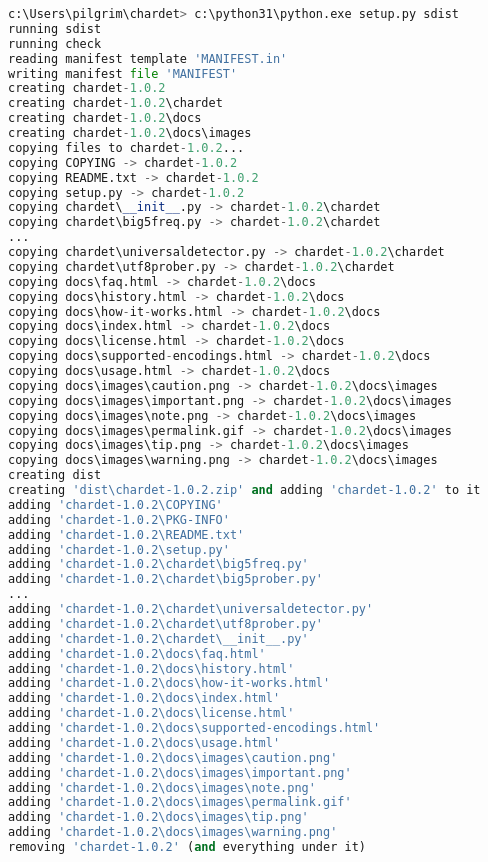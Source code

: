 {\begin{lstlisting}[language=Python,breaklines=true]
c:\Users\pilgrim\chardet> c:\python31\python.exe setup.py sdist
running sdist
running check
reading manifest template 'MANIFEST.in'
writing manifest file 'MANIFEST'
creating chardet-1.0.2
creating chardet-1.0.2\chardet
creating chardet-1.0.2\docs
creating chardet-1.0.2\docs\images
copying files to chardet-1.0.2...
copying COPYING -> chardet-1.0.2
copying README.txt -> chardet-1.0.2
copying setup.py -> chardet-1.0.2
copying chardet\__init__.py -> chardet-1.0.2\chardet
copying chardet\big5freq.py -> chardet-1.0.2\chardet
...
copying chardet\universaldetector.py -> chardet-1.0.2\chardet
copying chardet\utf8prober.py -> chardet-1.0.2\chardet
copying docs\faq.html -> chardet-1.0.2\docs
copying docs\history.html -> chardet-1.0.2\docs
copying docs\how-it-works.html -> chardet-1.0.2\docs
copying docs\index.html -> chardet-1.0.2\docs
copying docs\license.html -> chardet-1.0.2\docs
copying docs\supported-encodings.html -> chardet-1.0.2\docs
copying docs\usage.html -> chardet-1.0.2\docs
copying docs\images\caution.png -> chardet-1.0.2\docs\images
copying docs\images\important.png -> chardet-1.0.2\docs\images
copying docs\images\note.png -> chardet-1.0.2\docs\images
copying docs\images\permalink.gif -> chardet-1.0.2\docs\images
copying docs\images\tip.png -> chardet-1.0.2\docs\images
copying docs\images\warning.png -> chardet-1.0.2\docs\images
creating dist
creating 'dist\chardet-1.0.2.zip' and adding 'chardet-1.0.2' to it
adding 'chardet-1.0.2\COPYING'
adding 'chardet-1.0.2\PKG-INFO'
adding 'chardet-1.0.2\README.txt'
adding 'chardet-1.0.2\setup.py'
adding 'chardet-1.0.2\chardet\big5freq.py'
adding 'chardet-1.0.2\chardet\big5prober.py'
...
adding 'chardet-1.0.2\chardet\universaldetector.py'
adding 'chardet-1.0.2\chardet\utf8prober.py'
adding 'chardet-1.0.2\chardet\__init__.py'
adding 'chardet-1.0.2\docs\faq.html'
adding 'chardet-1.0.2\docs\history.html'
adding 'chardet-1.0.2\docs\how-it-works.html'
adding 'chardet-1.0.2\docs\index.html'
adding 'chardet-1.0.2\docs\license.html'
adding 'chardet-1.0.2\docs\supported-encodings.html'
adding 'chardet-1.0.2\docs\usage.html'
adding 'chardet-1.0.2\docs\images\caution.png'
adding 'chardet-1.0.2\docs\images\important.png'
adding 'chardet-1.0.2\docs\images\note.png'
adding 'chardet-1.0.2\docs\images\permalink.gif'
adding 'chardet-1.0.2\docs\images\tip.png'
adding 'chardet-1.0.2\docs\images\warning.png'
removing 'chardet-1.0.2' (and everything under it)
\end{lstlisting}

}
